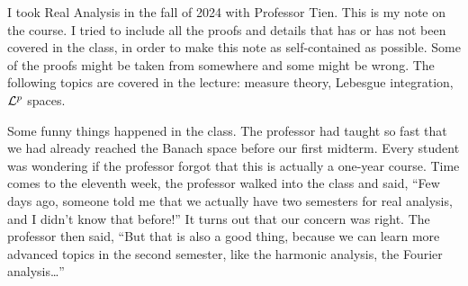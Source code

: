 I took Real Analysis in the fall of 2024 with Professor Tien. This is my 
note on the course. I tried to include all the proofs and details that has 
or has not been covered in the class, in order to make this note as 
self-contained as possible. Some of the proofs might be taken from 
somewhere and some might be wrong. The following topics are covered in 
the lecture: measure theory, Lebesgue integration, $\mathcal{L}^p$ spaces. 

Some funny things happened in the class. The professor had taught so 
fast that we had already reached the Banach space before our first 
midterm. Every student was wondering if the professor forgot that this 
is actually a one-year course. Time comes to the eleventh week, the 
professor walked into the class and said, ``Few days ago, someone told 
me that we actually have two semesters for real analysis, and I didn't 
know that before!'' It turns out that our concern was right. The professor 
then said, ``But that is also a good thing, because we can learn more 
advanced topics in the second semester, like the harmonic analysis, 
the Fourier analysis\ldots'' 